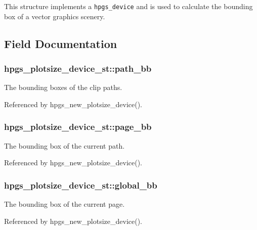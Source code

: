 This structure implements a {\tt hpgs\_\-device} and is used to calculate the bounding box of a vector graphics scenery. 

\subsection{Field Documentation}
\subsubsection[path\_\-bb]{ {\bf hpgs\_\-plotsize\_\-device\_\-st::path\_\-bb}}\label{structhpgs__plotsize__device__st_35db4a71c68d2dadd16f2fe5628af408}


The bounding boxes of the clip paths. 

Referenced by hpgs\_\-new\_\-plotsize\_\-device().
\subsubsection[page\_\-bb]{ {\bf hpgs\_\-plotsize\_\-device\_\-st::page\_\-bb}}\label{structhpgs__plotsize__device__st_1facd325cac492ed0f0e4ceae0e51b61}


The bounding box of the current path. 

Referenced by hpgs\_\-new\_\-plotsize\_\-device().
\subsubsection[global\_\-bb]{ {\bf hpgs\_\-plotsize\_\-device\_\-st::global\_\-bb}}\label{structhpgs__plotsize__device__st_ff4e09e9145c2584b76ba475bdbe7925}


The bounding box of the current page. 

Referenced by hpgs\_\-new\_\-plotsize\_\-device().
